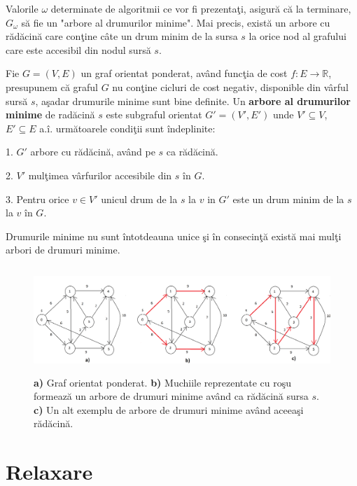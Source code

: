 \documentclass[11pt,a4paper]{report}
\newcommand{\R}{\mathbb{R}}
\begin{document}
  	Valorile $\omega$ determinate de algoritmii ce vor fi prezenta\c ti, asigur\u a c\u a la terminare, $G_{\omega}$ s\u a fie un "arbore al drumurilor minime". Mai precis, exist\u a un arbore cu r\u ad\u acin\u a care con\c tine c\^ ate un drum minim de la sursa $s$ la orice nod al grafului care este accesibil din nodul surs\u a $s$. 
  	
  	Fie $G=(V,E)$ un graf orientat ponderat, av\^ and func\c tia de cost $f:E \longrightarrow \R$, presupunem c\u a graful $G$ nu con\c tine cicluri de cost negativ, disponible din v\^ arful surs\u a $s$, a\c sadar drumurile minime sunt bine definite. Un \textbf{arbore al drumurilor minime} de rad\u acin\u a $s$ este subgraful orientat $G'=(V',E')$ unde $V'\subseteq V$, $E'\subseteq E$ a.\^ i. urm\u atoarele condi\c tii sunt \^ indeplinite:
  	
  	\vspace{0.2cm}
  	1. $G'$ arbore  cu r\u ad\u acin\u a, av\^ and pe $s$ ca r\u ad\u acin\u a.
  	\vspace{0.1cm}
  	
  	2. $V'$ mul\c timea v\^ arfurilor accesibile din $s$ \^ in $G$.
  	\vspace{0.1cm}
  	
  	3. Pentru orice $v\in V'$ unicul drum de la $s$ la $v$ in $G'$ este un drum minim de la $s$ la $v$ \^ in $G$.
  	\vspace{0.1cm}
  	
  	Drumurile minime nu sunt \^ intotdeauna unice \c si \^ in consecin\c t\u a exist\u a mai mul\c ti arbori de drumuri minime.
  	 \begin{figure}[!hbt]
  		\centering
  		\includegraphics[width=12cm,height=4cm]{ArboreMinim.png}
  		\caption{ \textbf{a)} Graf orientat ponderat. \textbf{b)} Muchiile reprezentate cu ro\c su formeaz\u a un arbore de drumuri minime av\^ and ca r\u ad\u acin\u a sursa $s$. \textbf{c)} Un alt exemplu de arbore de drumuri minime av\^ and aceea\c si r\u ad\u acin\u a.}
  	\end{figure}
  	
  	\section{Relaxare}
  	
\end{document}
